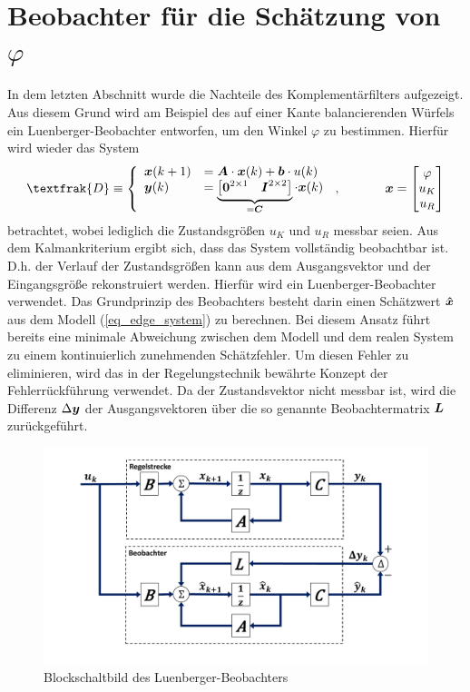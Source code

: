 \section{Beobachter für die Schätzung von $\varphi$}
In dem letzten Abschnitt wurde die Nachteile des Komplementärfilters aufgezeigt. Aus diesem Grund wird am Beispiel des auf einer Kante balancierenden Würfels ein Luenberger-Beobachter entworfen, um den Winkel $\varphi$ zu bestimmen. Hierfür wird wieder das System
\begin{equation}
\textfrak{D} \equiv \left\{ \begin{array}{ll}
\bs{x}(k+1) &= \bs{A}\cdot \bs{x}(k) + \bs{b}\cdot u(k)
\\
\bs{y}(k) &= \underbrace{\begin{bmatrix}
\bs{0}^{2\times 1} & \bs{I}^{2\times 2}
\end{bmatrix}}_{= \bs{C}} \cdot \bs{x}(k)
\end{array}\right.\,, \hspace{35pt} \bs{x}=\begin{bmatrix}
\varphi \\ u_K \\ u_R
\end{bmatrix}
\label{eq_edge_system}
\end{equation}
betrachtet, wobei lediglich die Zustandsgrößen $u_K$ und $u_R$ messbar seien. Aus dem Kalmankriterium ergibt sich, dass das System vollständig beobachtbar ist. D.h. der Verlauf der Zustandsgrößen kann aus dem Ausgangsvektor und der Eingangsgröße rekonstruiert werden. Hierfür wird ein Luenberger-Beobachter verwendet. Das Grundprinzip des Beobachters besteht darin einen Schätzwert $\boldsymbol{\hat{x}}$ aus dem Modell (\ref{eq_edge_system}) zu berechnen. Bei diesem Ansatz führt bereits eine minimale Abweichung zwischen dem Modell und dem realen System zu einem kontinuierlich zunehmenden Schätzfehler. Um diesen Fehler zu eliminieren, wird das in der Regelungstechnik bewährte Konzept der Fehlerrückführung verwendet. Da der Zustandsvektor nicht messbar ist, wird  die Differenz $\Delta \boldsymbol{y}$ der Ausgangsvektoren über die so genannte Beobachtermatrix $\boldsymbol{L}$ zurückgeführt.
\begin{figure}[h!]
\centering
\includegraphics[width=1\linewidth, trim={1cm 1cm 1cm 1cm}, clip]{img/Observer}
\caption{Blockschaltbild des Luenberger-Beobachters}
\end{figure}

